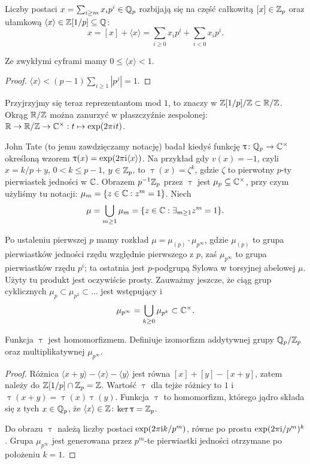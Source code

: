 \begin{definicja} \label{cptmetal}
	Liczby postaci $x = \sum_{i \ge m} x_i p^i \in \mathbb Q_p$ rozbijają się na część całkowitą $[x] \in \mathbb Z_p$ oraz ułamkową $\langle x \rangle \in \mathbb Z[1/p] \subseteq \mathbb Q$:
	\[
		x = [x] + \langle x \rangle = \sum_{i \ge 0} x_i p^i + \sum_{i < 0} x_i p^i.
	\]
\end{definicja}

\begin{fakt}
	Ze zwykłymi cyframi mamy $0 \le \langle x \rangle < 1$.
\end{fakt}

\begin{proof}
	$\langle x \rangle < (p-1) \sum_{i \ge 1} |p^j| = 1$.
\end{proof}

Przyjrzyjmy się teraz reprezentantom mod $1$, to znaczy w $\mathbb Z[1/p] / \mathbb Z \subset \mathbb R / \mathbb Z$.
Okrąg $\mathbb R / \mathbb Z$ można zanurzyć w płaszczyźnie zespolonej: $\mathbb R \to \mathbb R / \mathbb Z \to \mathbb C^\times : t \mapsto \exp (2 \pi i t)$.

John Tate (to jemu zawdzięczamy notację) badał kiedyś funkcję $\uptau \colon \mathbb Q_p \to \mathbb C^\times$ określoną wzorem $\uptau(x) = \exp(2 \pi \textrm{i} \langle x \rangle)$.
Na przykład gdy $v(x) = -1$, czyli $x = k/p + y$, $0 < k \le p-1$, $y \in \mathbb Z_p$, to $\uptau(x) = \zeta^k$, gdzie $\zeta$ to pierwotny $p$-ty pierwiastek jedności w $\mathbb C$.
Obrazem $p^{-1} \mathbb Z_p$ przez $\uptau$ jest $\mu_p \subseteq \mathbb C^\times$, przy czym użyliśmy tu notacji: $\mu_m = \{z \in \mathbb C : z^m = 1\}$.
Niech
\[
	\mu = \bigcup_{m \ge 1} \mu_m = \{z \in \mathbb C : \exists_{m \ge 1} z^m = 1\}.
\]

Po ustaleniu pierwszej $p$ mamy rozkład $\mu = \mu_{(p)} \cdot \mu_{p^\infty}$, gdzie $\mu_{(p)}$ to grupa pierwiastków jedności rzędu względnie pierwszego z $p$, zaś $\mu_{p^\infty}$ to grupa pierwiastków rzędu $p^i$; ta ostatnia jest $p$-podgrupą Sylowa w torsyjnej abelowej $\mu$.
Użyty tu produkt jest oczywiście prosty.
Zauważmy jeszcze, że ciąg grup cyklicznych $\mu_p \subset \mu_{p^2} \subset \ldots$ jest wstępujący i
\[
	\mu_{p^\infty} = \bigcup_{k \ge 0} \mu_{p^k} \subset \mathbb C^\times.
\]

\begin{fakt}
	Funkcja $\uptau$ jest homomorfizmem.
	Definiuje izomorfizm addytywnej grupy $\mathbb Q_p/\mathbb Z_p$ oraz multiplikatywnej $\mu_{p^\infty}$.
\end{fakt}

\begin{proof}
	Różnica $\langle x+y \rangle - \langle x \rangle - \langle y \rangle$ jest równa $[x]+[y] - [x+y]$, zatem należy do $\mathbb Z[1/p] \cap \mathbb Z_p = \mathbb Z$.
	Wartość $\uptau$ dla tejże różnicy to $1$ i $\uptau(x+y) = \uptau(x) \uptau(y)$.
	Funkcja $\uptau$ to homomorfizm, którego jądro składa się z tych $x \in \mathbb Q_p$, że $\langle x \rangle \in \mathbb Z$: $\ker \uptau = \mathbb Z_p$.

	Do obrazu $\uptau$ należą liczby postaci $\exp(2\pi \textrm{i} k/p^m)$, równe po prostu $\exp(2 \pi \textrm{i} / p^m)^k$.
	Grupa $\mu_{p^\infty}$ jest generowana przez $p^m$-te pierwiastki jedności otrzymane po położeniu $k = 1$.
\end{proof}

